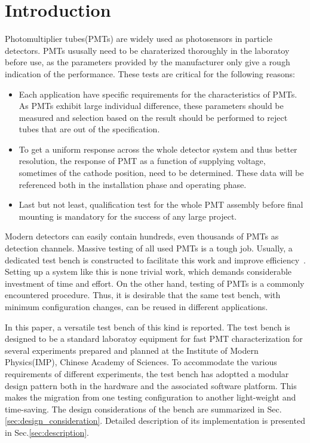 \documentclass[5p, times]{elsarticle}
\begin{document}
\section{Introduction}
\label{sec:introduction}

Photomultiplier tubes(PMTs) are widely used as photosensors in particle detectors.
PMTs ususally need to be charaterized thoroughly in the laboratoy before use, as the parameters provided by the manufacturer only give a rough indication of the performance.
These tests are critical for the following reasons:
\begin{itemize}
 \item Each application have specific requirements for the characteristics of PMTs.
 As PMTs exhibit large individual difference, these parameters should be measured and selection based on the result should be performed to reject tubes that are out of the specification.
 \item To get a uniform response across the whole detector system and thus better resolution, the response of PMT as a function of supplying voltage, sometimes of the cathode position, need to be determined.
  These data will be referenced both in the installation phase and operating phase. 
 \item Last but not least, qualification test for the whole PMT assembly before final mounting is mandatory for the success of any large project. 
\end{itemize}

Modern detectors can easily contain hundreds, even thousands of PMTs as detection channels.
Massive testing of all used PMTs is a tough job.
Usually, a dedicated test bench is constructed to facilitate this work and improve efficiency~\cite{barnhill_testing_2008,akgun_complete_2005,adragna_pmt-block_2006}.
Setting up a system like this is none trivial work, which demands considerable investment of time and effort.
On the other hand, testing of PMTs is a commonly encountered procedure.
Thus, it is desirable that the same test bench, with minimum configuration changes, can be reused in different applications. 

In this paper, a versatile test bench of this kind is reported.
The test bench is designed to be a standard laboratoy equipment for fast PMT characterization for several experiments prepared and planned at the Institute of Modern Physics(IMP), Chinese Academy of Sciences.
To accommodate the various requirements of different experiments, the test bench has adoptted a modular design pattern both in the hardware and the associated software platform.
This makes the migration from one testing configuration to another light-weight and time-saving.
The design considerations of the bench are summarized in Sec.\ref{sec:design_consideration}.
Detailed description of its implementation is presented in Sec.\ref{sec:description}.
\end{document}
